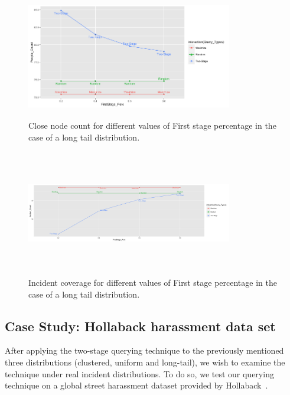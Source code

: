 \documentclass{acm_proc_article-sp}
\begin{document}
\begin{figure}[!h]
\centering
 \includegraphics[width=9cm ,height=5.5cm]{figuresPng/LT-closePeople.png}
 \caption{Close node count for different values of First stage percentage in the case of a long tail distribution. }
 \label{fig:LTClosePeople}
\end{figure}

\begin{figure}[!h]
\centering
 \includegraphics[width=9cm ,height=5.5cm]{figuresPng/LT-incidCov.png}
 \caption{Incident coverage for different values of First stage percentage in the case of a long tail distribution. }
 \label{fig:LTIncdCove}
\end{figure}

\subsection{Case Study: Hollaback harassment data set}
After applying the two-stage querying technique to the previously mentioned three distributions (clustered, uniform and long-tail), we wish to examine the technique under real incident distributions. To do so, we test our querying technique on a global street harassment dataset provided by Hollaback~\cite{hollaback}.
\end{document}
